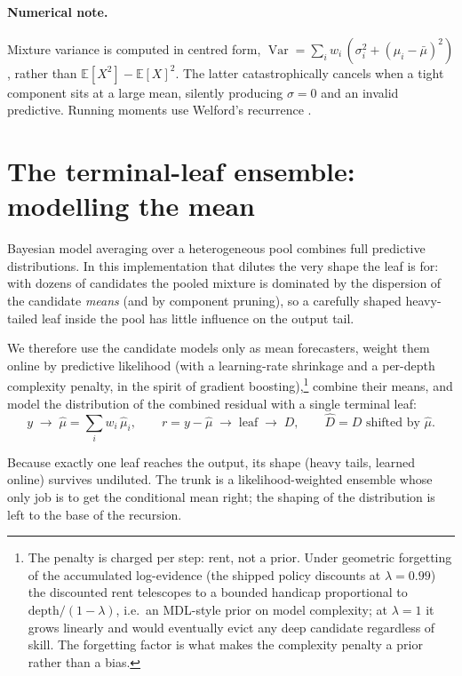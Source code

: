 \documentclass[article]{jss}
\begin{document}
\paragraph{Numerical note.}
Mixture variance is computed in centred form,
$\operatorname{Var} = \sum_i w_i\,(\sigma_i^2 + (\mu_i-\bar\mu)^2)$, rather than
$\mathbb E[X^2]-\mathbb E[X]^2$. The latter catastrophically cancels when a tight
component sits at a large mean, silently producing $\sigma=0$ and an invalid
predictive. Running moments use Welford's recurrence \citep{welford1962note}.

\section{The terminal-leaf ensemble: modelling the mean} \label{sec:trunk}

Bayesian model averaging over a heterogeneous pool
\citep{hoeting1999bayesian,raftery2005using} combines full predictive
distributions. In this implementation that dilutes the very shape the leaf is
for: with dozens of candidates the pooled mixture is dominated by the dispersion
of the candidate \emph{means} (and by component pruning), so a carefully shaped
heavy-tailed leaf inside the pool has little influence on the output tail.

We therefore use the candidate models
only as mean forecasters, weight them online by predictive likelihood
(with a learning-rate shrinkage and a per-depth complexity penalty, in the
spirit of gradient boosting),\footnote{The penalty is charged per step:
rent, not a prior. Under geometric forgetting of the accumulated log-evidence
(the shipped policy discounts at $\lambda=0.99$) the discounted rent
telescopes to a bounded handicap proportional to $\text{depth}/(1-\lambda)$,
i.e.\ an MDL-style prior on model complexity; at $\lambda=1$ it grows linearly
and would eventually evict any deep candidate regardless of skill. The
forgetting factor is what makes the complexity penalty a prior rather than a
bias.} combine their means, and model the distribution of
the combined residual with a single terminal leaf:
\[
 y \;\to\; \hat\mu = \sum_i w_i\,\hat\mu_i, \qquad
 r = y-\hat\mu \;\to\; \text{leaf} \;\to\; D, \qquad
 \hat D = D \text{ shifted by } \hat\mu .
\]

Because exactly one leaf reaches the output, its shape (heavy tails, learned
online) survives undiluted. The trunk is a likelihood-weighted ensemble whose
only job is to get the conditional mean right; the shaping of the distribution is
left to the base of the recursion.
\end{document}
